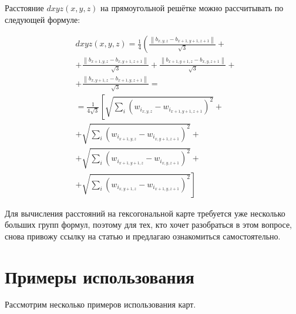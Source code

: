 \documentclass[a4paper,12pt]{article}
\begin{document}
Расстояние $dxyz(x,y,z)$ на прямоугольной решётке можно рассчитывать по следующей формуле:

$$\begin{aligned}
  &d x y z(x, y, z)=\frac{1}{4}\left(\frac{\left\|b_{x, y, z}-b_{x+1, y+1, z+1}\right\|}{\sqrt{3}}+\right.\\
  &+\frac{\left\|b_{x+1, y, z}-b_{x, y+1, z+1}\right\|}{\sqrt{3}}+\frac{\left\|b_{x+1, y+1, z}-b_{x, y, z+1}\right\|}{\sqrt{3}}+\\
  &+\frac{\left\|b_{x, y+1, z}-b_{x+1, y, z+1}\right\|}{\sqrt{3}}=\\
  &=\frac{1}{4 \sqrt{3}}\left[ \sqrt{\sum_{i}\left(w_{i_{x, y, z}}-w_{i_{x+1, y+1, z+1}}\right)^{2}}+\right.\\
  &+\sqrt{\sum_{i}\left(w_{i_{x+1, y, z}}-w_{i_{x, y+1, z+1}}\right)^{2}}+\\
  &+\sqrt{\sum_{i}\left(w_{i_{x+1, y+1, z}}-w_{i_{x, y, z+1}}\right)^{2}}+\\
  &\left.+\sqrt{\sum_{i}\left(w_{i_{x, y+1, z}}-w_{i_{x+1, y, z+1}}\right)^{2}} \right]
  \end{aligned}$$

Для вычисления расстояний на гексогональной карте требуется уже несколько больших групп формул, поэтому для тех, кто хочет разобраться в этом вопросе, снова привожу ссылку на статью \cite{distance} и предлагаю ознакомиться самостоятельно.

\section{Примеры использования}

Рассмотрим несколько примеров использования карт.
\end{document}
